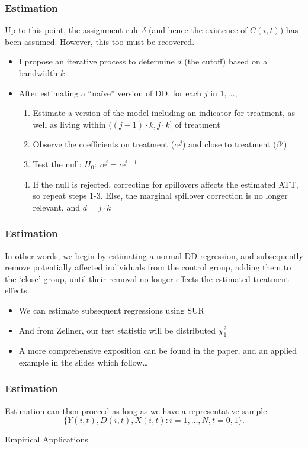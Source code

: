 \documentclass[10pt,letterpaper,subeqn]{beamer}
\begin{document}
\begin{frame}[label=estim9]
  \frametitle{Estimation}
Up to this point, the assignment rule $\delta$ (and hence the existence of 
$C(i,t)$) has been assumed.  However, this too must be recovered.
\vspace{5mm}
\begin{itemize}
\item I propose an iterative process to determine $d$ (the cutoff) based on a
bandwidth $k$
\item After estimating a ``na\"ive'' version of DD, for each $j$ in $1,\ldots,$
\vspace{2mm}
\begin{enumerate}
\item Estimate a version of the model including an indicator for treatment,
as well as living within $((j-1)\cdot k, j\cdot k]$ of treatment
\item Observe the coefficients on treatment ($\alpha^j$) and close to treatment
($\beta^j$)
\item Test the null: $H_0:\ \alpha^j=\alpha^{j-1}$
\item If the null is rejected, correcting for spillovers affects the estimated
ATT, so repeat steps 1-3.  Else, the marginal spillover correction is no longer 
relevant, and $d=j\cdot k$
\end{enumerate}
\end{itemize}
\end{frame}

\begin{frame}[label=estim10]
  \frametitle{Estimation}
In other words, we begin by estimating a normal DD regression, and subsequently
remove potentially affected individuals from the control group, adding them to
the `close' group, until their removal no longer effects the estimated treatment 
effects.
\vspace{6mm}
\begin{itemize}
\item We can estimate subsequent regressions using SUR
\item And from Zellner, our test statistic will be distributed $\chi^2_1$
\item A more comprehensive exposition can be found in the paper, and an applied
example in the slides which follow\ldots
\end{itemize}  
\end{frame}

\begin{frame}[label=estim10]
  \frametitle{Estimation}
Estimation can then proceed as long as we have a representative sample:
\vspace{4mm}
\[
\{Y(i,t), D(i,t), X(i,t): i=1, \ldots, N, t=0, 1\}.
\]
\end{frame}
\begin{frame}
\begin{center}
\Large Empirical Applications
\end{center}
\end{frame}
\end{document}
